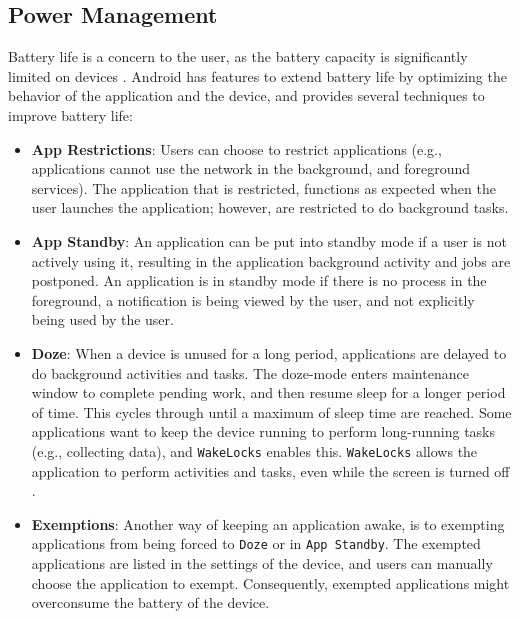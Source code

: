 \subsection{Power Management}
Battery life is a concern to the user, as the battery capacity is significantly limited on devices \cite{powermanagement}. Android has features to extend battery life by optimizing the behavior of the application and the device, and provides several techniques to improve battery life:
\begin{itemize}
    \item \textbf{App Restrictions}: Users can choose to restrict applications (e.g., applications cannot use the network in the background, and foreground services). The application that is restricted, functions as expected when the user launches the application; however, are restricted to do background tasks. 
    \item \textbf{App Standby}: An application can be put into standby mode if a user is not actively using it, resulting in the application background activity and jobs are postponed. An application is in standby mode if there is no process in the foreground, a notification is being viewed by the user, and not explicitly being used by the user. 
    \item \textbf{Doze}: When a device is unused for a long period, applications are delayed to do background activities and tasks. The doze-mode enters maintenance window to complete pending work, and then resume sleep for a longer period of time. This cycles through until a maximum of sleep time are reached. Some applications want to keep the device running to perform long-running tasks (e.g., collecting data), and \verb|WakeLocks| enables this. \verb|WakeLocks| allows the application to perform activities and tasks, even while the screen is turned off \cite{wakelocks}. 
    \item \textbf{Exemptions}: Another way of keeping an application awake, is to exempting applications from being forced to \verb|Doze| or in \verb|App Standby|. The exempted applications are listed in the settings of the device, and users can manually choose the application to exempt. Consequently, exempted applications might overconsume the battery of the device. 
\end{itemize}


